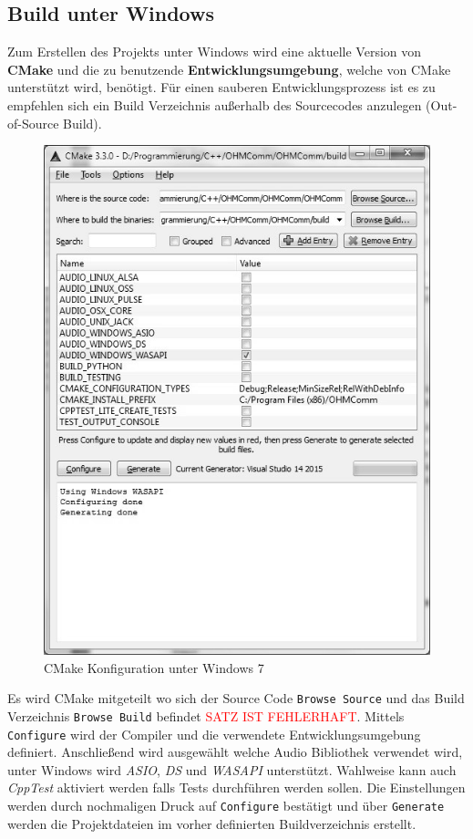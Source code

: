 \subsection{Build unter Windows}
Zum Erstellen des Projekts unter Windows wird eine aktuelle Version von \textbf{CMake} und die zu benutzende \textbf{Entwicklungsumgebung}, welche von CMake unterstützt wird, benötigt.
Für einen sauberen Entwicklungsprozess ist es zu empfehlen sich ein Build Verzeichnis außerhalb des Sourcecodes anzulegen (Out-of-Source Build).

\begin{figure}[htp]
\centering
\includegraphics[width=.80\textwidth]{images/CMake}
\caption{CMake Konfiguration unter Windows 7}
\label{Fig:CMake}
\end{figure}

Es wird CMake mitgeteilt wo sich der Source Code \texttt{Browse Source} und das Build Verzeichnis \texttt{Browse Build} befindet \textcolor{red}{SATZ IST FEHLERHAFT}.
Mittels \texttt{Configure} wird der Compiler und die verwendete Entwicklungsumgebung definiert.
Anschließend wird ausgewählt welche Audio Bibliothek verwendet wird, unter Windows wird \textit{ASIO}, \textit{DS} und \textit{WASAPI} unterstützt. Wahlweise kann auch \textit{CppTest} aktiviert werden falls Tests durchführen werden sollen.
Die Einstellungen werden durch nochmaligen Druck auf \texttt{Configure} bestätigt und über \texttt{Generate} werden die Projektdateien im vorher definierten Buildverzeichnis erstellt.

